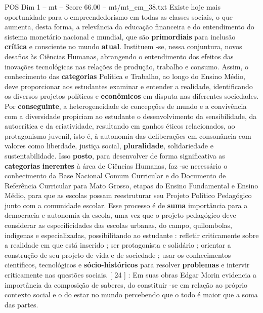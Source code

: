 \begin{textsample}{POS Dim 1 – mt – Score 66.00 – mt/mt\_em\_38.txt}
Existe hoje mais oportunidade para o empreendedorismo em todas as classes sociais, o que aumenta, desta forma, a relevância da educação financeira e do entendimento do sistema monetário nacional e mundial, que são \textbf{primordiais} para inclusão \textbf{crítica} e consciente no mundo \textbf{atual}.
Instituem -se, nessa conjuntura, novos desafios às Ciências Humanas, abrangendo o entendimento dos efeitos das inovações tecnológicas nas relações de produção, trabalho e consumo.
Assim, o conhecimento das \textbf{categorias} Política e Trabalho, ao longo do Ensino Médio, deve proporcionar aos estudantes examinar e entender a realidade, identificando os diversos projetos políticos e \textbf{econômicos} em disputa nas diferentes sociedades.
Por \textbf{conseguinte}, a heterogeneidade de concepções de mundo e a convivência com a diversidade propiciam ao estudante o desenvolvimento da sensibilidade, da autocrítica e da criatividade, resultando em ganhos éticos relacionados, ao protagonismo juvenil, isto é, à autonomia das deliberações em consonância com valores como liberdade, justiça social, \textbf{pluralidade}, solidariedade e sustentabilidade.
Isso \textbf{posto}, para desenvolver de forma significativa as \textbf{categorias} \textbf{inerentes} à área de Ciências Humanas, faz -se necessário o conhecimento da Base Nacional Comum Curricular e do Documento de Referência Curricular para Mato Grosso, etapas do Ensino Fundamental e Ensino Médio, para que as escolas possam reestruturar seu Projeto Político Pedagógico junto com a comunidade escolar.
Esse processo é de \textbf{suma} importância para a democracia e autonomia da escola, uma vez que o projeto pedagógico deve considerar as especificidades das escolas urbanas, do campo, quilombolas, indígenas e especializadas, possibilitando ao estudante : refletir criticamente sobre a realidade em que está inserido ; ser protagonista e solidário ; orientar a construção de seu projeto de vida e de sociedade ; usar os conhecimentos científicos, tecnológicos e \textbf{sócio-históricos} para resolver \textbf{problemas} e intervir criticamente nas questões sociais. [ 24 ] : Em suas obras Edgar Morin evidencia a importância da composição de saberes, do constituir -se em relação ao próprio contexto social e o do estar no mundo percebendo que o todo é maior que a soma das partes.

\end{textsample}
